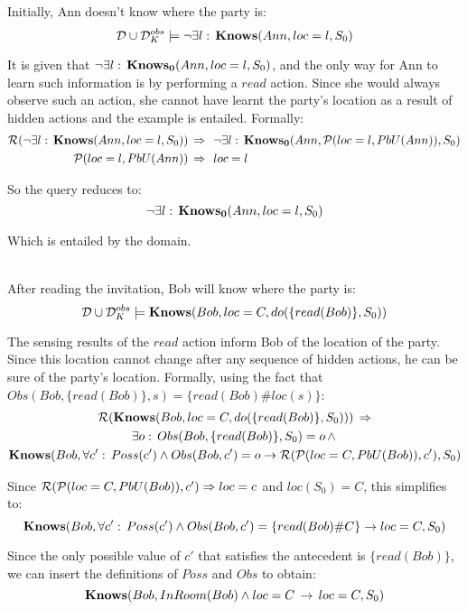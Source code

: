 \begin{example}
Initially, Ann doesn't know where the party is:\[
\mathcal{D}\cup\mathcal{D}_{K}^{obs}\models\neg\exists l:\,\mathbf{Knows}(Ann,loc=l,S_{0})\]

\end{example}
It is given that $\neg\exists l:\,\mathbf{Knows_{0}}(Ann,loc=l,S_{0})$, and
the only way for Ann to learn such information is by performing a
$read$ action. Since she would always observe such an action, she
cannot have learnt the party's location as a result of hidden actions
and the example is entailed. Formally:\begin{align*}
\mathcal{R}(\neg\exists l:\,\mathbf{Knows}(Ann,loc=l,S_{0}))\,\Rightarrow\,\,\,\, & \neg\exists l:\,\mathbf{Knows_{0}}(Ann,\mathcal{P}(loc=l,PbU(Ann)),S_{0})\\
\mathcal{P}(loc=l,PbU(Ann))\,\Rightarrow\,\,\,\, & loc=l\end{align*}


So the query reduces to:\[
\neg\exists l:\,\mathbf{Knows_{0}}(Ann,loc=l,S_{0})\]


Which is entailed by the domain.\\
 \\


\begin{example}
After reading the invitation, Bob will know where the party is:\[
\mathcal{D}\cup\mathcal{D}_{K}^{obs}\models\mathbf{Knows}(Bob,loc=C,do(\{read(Bob)\},S_{0}))\]

\end{example}
The sensing results of the $read$ action inform Bob of the location
of the party. Since this location cannot change after any sequence
of hidden actions, he can be sure of the party's location. Formally,
using the fact that $Obs(Bob,\{read(Bob)\},s)=\{read(Bob)\#loc(s)\}$:\begin{multline*}
\mathcal{R}(\mathbf{Knows}(Bob,loc=C,do(\{read(Bob)\},S_{0})))\,\Rightarrow\\
\exists o:\, Obs(Bob,\{read(Bob)\},S_{0})=o\,\wedge\,\\
\mathbf{Knows}(Bob,\forall c':\, Poss(c')\wedge Obs(Bob,c')=o\rightarrow\mathcal{R}(\mathcal{P}(loc=C,PbU(Bob)),c'),S_{0})\end{multline*}


Since $\mathcal{R}(\mathcal{P}(loc=C,PbU(Bob)),c')\Rightarrow loc=c$ and $loc(S_{0})=C$,
this simplifies to:\[
\mathbf{Knows}(Bob,\forall c':\, Poss(c')\wedge Obs(Bob,c')=\{read(Bob)\#C\}\rightarrow loc=C,S_{0})\]


Since the only possible value of $c'$ that satisfies the antecedent
is $\{read(Bob)\}$, we can insert the definitions of $Poss$ and
$Obs$ to obtain:\[
\mathbf{Knows}(Bob,InRoom(Bob)\wedge loc=C\,\rightarrow\, loc=C,S_{0})\]


